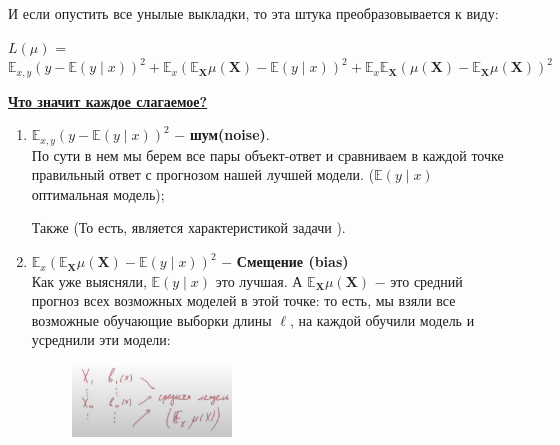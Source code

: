             И если опустить все унылые выкладки, то эта штука преобразовывается к виду:
            \begin{center}
            \Large
                $L(\mu)$ = $\mathbb{E}_{x, y}(y - \mathbb{E}(y \mid x))^2 + \mathbb{E}_x(\mathbb{E}_{\mathbf{X}}\mu(\mathbf{X}) - \mathbb{E}(y \mid x))^2 + \mathbb{E}_x\mathbb{E}_\mathbf{X}( \mu(\mathbf{X}) - \mathbb{E}_\mathbf{X}\mu(\mathbf{X}) )^2$
            \end{center}

            \underline{\textbf{Что значит каждое слагаемое?}}
            \begin{enumerate}
                \item $\mathbb{E}_{x, y}(y - \mathbb{E}(y \mid x))^2$ $-$ \textbf{шум(noise)}.\\

                    По сути в нем мы берем все пары объект-ответ и сравниваем в каждой точке правильный ответ с прогнозом нашей лучшей модели.  ($\mathbb{E}(y \mid x)$ оптимальная модель);


                    Также  (То есть, является характеристикой задачи ).\\

                \item $\mathbb{E}_x(\mathbb{E}_{\mathbf{X}}\mu(\mathbf{X}) - \mathbb{E}(y \mid x))^2$ $-$ \textbf{Смещение (bias)}\\

                Как уже выясняли, $\mathbb{E}(y \mid x)$ это лучшая. А $\mathbb{E}_{\mathbf{X}}\mu(\mathbf{X})$ $-$ это средний прогноз всех возможных моделей в этой точке: то есть, мы взяли все возможные обучающие выборки длины $\ell$, на каждой обучили модель и усреднили эти модели:
                \begin{figure}[H]
                    \centering
                    \includegraphics[width=0.4\textwidth]{images/9lecture/bias.png}
                \end{figure}


\end{enumerate}
